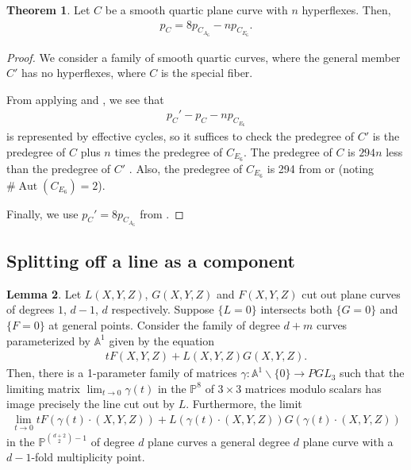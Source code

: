 \documentclass{article}
\theoremstyle{definition}
\newtheorem{thm}{Theorem}[section]
\newtheorem{lem}[thm]{Lemma}
\newcommand{\on}{\operatorname}
\newcommand{\mb}{\mathbb}
\begin{document}
\begin{thm}
\label{allsmooth}
Let $C$ be a smooth quartic plane curve with $n$ hyperflexes. Then,
\begin{align*}
    p_C = 8p_{C_{A_6}}-np_{C_{E_6}}. 
\end{align*}
\end{thm}

\begin{proof}
We consider a family of smooth quartic curves, where the general member $C'$ has no hyperflexes, where $C$ is the special fiber. 

From applying  and , we see that 
\begin{align*}
    p_C'-p_C-np_{C_{E_6}}
\end{align*}
is represented by effective cycles, so it suffices to check the predegree of $C'$ is the predegree of $C$ plus $n$ times the predegree of $C_{E_6}$. The predegree of $C$ is $294n$ less than the predegree of $C'$ \cite[Section 3.6]{AF93}. Also, the predegree of $C_{E_6}$ is 294 from \cite[bottom of page 36]{AF00} or  (noting $\#\on{Aut}(C_{E_6})=2$). 

Finally, we use $p_C'=8p_{C_{A_6}}$ from .
\end{proof}

\subsection{Splitting off a line as a component}
\begin{lem}
\label{line}
Let $L(X,Y,Z)$, $G(X,Y,Z)$ and $F(X,Y,Z)$ cut out plane curves of degrees $1$, $d-1$, $d$ respectively. Suppose $\{L=0\}$ intersects both $\{G=0\}$ and $\{F=0\}$ at general points. Consider the family of degree $d+m$ curves parameterized by $\mb{A}^1$ given by the equation
\begin{align*}
    tF(X,Y,Z)+L(X,Y,Z)G(X,Y,Z).
\end{align*}
Then, there is a 1-parameter family of matrices $\gamma: \mb{A}^1\backslash\{0\}\to PGL_3$ such that the limiting matrix $\lim_{t\to 0}{\gamma(t)}$ in the $\mb{P}^8$ of $3\times 3$ matrices modulo scalars has image precisely the line cut out by $L$. Furthermore, the limit
\begin{align*}
    \lim_{t\to 0}tF(\gamma(t)\cdot (X,Y,Z))+L(\gamma(t)\cdot (X,Y,Z))G(\gamma(t)\cdot (X,Y,Z))
\end{align*}
in the $\mb{P}^{\binom{d+2}{2}-1}$ of degree $d$ plane curves a general degree $d$ plane curve with a $d-1$-fold multiplicity point. 
\end{lem}
\end{document}
